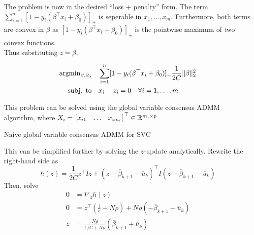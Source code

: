 \documentclass[11pt]{article}
\begin{document}
The problem is now in the desired ``loss + penalty'' form. The term $\sum_{i=1}^n [1 - y_i (\beta^\top x_i + \beta_0)]_+$  is seperable in $x_1, \ldots, x_m$. 
Furthermore, both terms are convex in $\beta$ as $[1 - y_i (\beta^\top x_i + \beta_0)]_+$ is the pointwise maximum of two convex functions. \\

Thus substituting $z = \beta$, 

\begin{equation} 
\begin{aligned}
\operatorname{argmin}_{\beta, \beta_0} \quad 
&  \sum_{i=1}^n [1 - y_i (\beta^\top x_i + \beta_0)]_+ \frac{1}{2C} \|\beta\|_2^2 \\
\textrm{subj. to} \quad & x_i - z_i = 0 \quad \forall i = 1, \ldots, m
\end{aligned}
\end{equation}

This problem can be solved using the global variable consensus ADMM algorithm, 
where $X_i = \begin{bmatrix} x_{i1} & \ldots & x_{im_i} \end{bmatrix}^\top \in \mathbb{R}^{m_i \times p}$ \\

\begin{algorithm}[H]
    \caption{Naive global variable consensus ADMM for SVC}

    \SetAlgoNoLine

\end{algorithm}
\vspace{5pt}
This can be simplified further by solving the $z$-update analytically. Rewrite the right-hand 
side as 
\[
    h(z) = \frac{1}{2C} z^\top I z + (z - \overline{\beta}_{k+1} - \overline{u}_k)^\top I (z - \overline{\beta}_{k+1} - \overline{u}_k)
\]
Then, solve 
\begin{align*}
    0 &= \nabla_z h(z)  \\
    0 &= z^\top \left(\frac{1}{c} + N\rho \right) + N\rho \left(- \overline{\beta}_{k+1} - \overline{u}_k \right) \\
    z &= \frac{N \rho}{1/C + N\rho} \left( \overline{\beta}_{k+1} + \overline{u}_k \right)
\end{align*}
\end{document}
